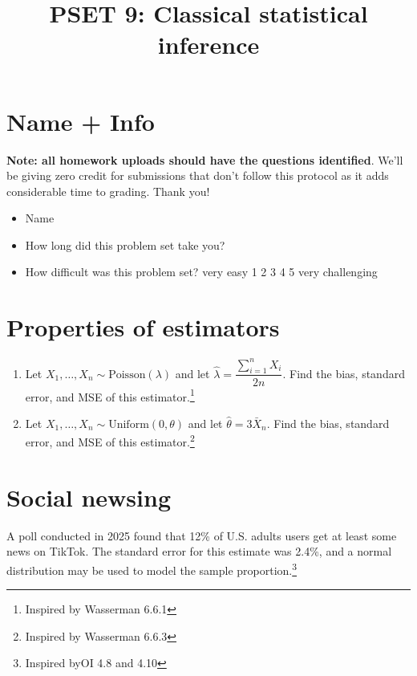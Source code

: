 \documentclass[
]{article}
\title{PSET 9: Classical statistical inference}
\author{}
\date{\vspace{-2.5em}}
\begin{document}
\maketitle

\section{Name + Info}\label{name-info}

\textbf{Note: all homework uploads should have the questions
identified}. We'll be giving zero credit for submissions that don't
follow this protocol as it adds considerable time to grading. Thank you!

\begin{itemize}
\item
  Name
\item
  How long did this problem set take you?
\item
  How difficult was this problem set? very easy 1 2 3 4 5 very
  challenging
\end{itemize}

\section{Properties of estimators}\label{properties-of-estimators}

\begin{enumerate}
\def\labelenumi{\alph{enumi}.}
\item
  Let \(X_1, \ldots, X_n \sim \text{Poisson}(\lambda)\) and let
  \(\hat{\lambda} = \dfrac{\sum_{i=1}^n X_i}{2n}\). Find the bias,
  standard error, and MSE of this estimator.\footnote{Inspired by
    Wasserman 6.6.1}
\item
  Let \(X_1, \ldots, X_n \sim \text{Uniform}(0, \theta)\) and let
  \(\hat{\theta} = 3 \bar{X}_n\). Find the bias, standard error, and MSE
  of this estimator.\footnote{Inspired by Wasserman 6.6.3}
\end{enumerate}

\section{Social newsing}\label{social-newsing}

A poll conducted in 2025 found that 12\% of U.S. adults users get at
least some news on TikTok. The standard error for this estimate was
2.4\%, and a normal distribution may be used to model the sample
proportion.\footnote{Inspired byOI 4.8 and 4.10}
\end{document}
